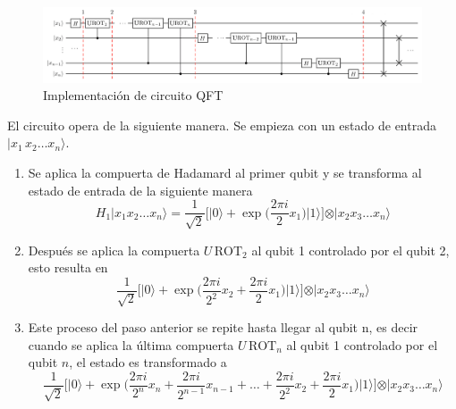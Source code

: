 \documentclass[a4paper]{article}
\begin{document}
\begin{figure}[h]
\begin{center}
\includegraphics[scale=0.29]{./qft_circuit.png} 
\end{center} 
\caption{Implementación de circuito QFT}
\label{fig::QFT_circuit}
\end{figure}
El circuito opera de la siguiente manera. Se empieza con un estado de entrada $\vert x_1\, x_2\hdots x_n\rangle$.
\begin{enumerate}
\item Se aplica la compuerta de Hadamard al primer qubit y se transforma al estado de entrada de la siguiente manera
\begin{equation}
H_1\vert x_1 x_2\hdots x_n\rangle=\frac{1}{\sqrt{2}}\bigg[\vert 0\rangle + \exp{\bigg(\frac{2\pi i }{2} x_1\bigg)}\vert 1\rangle\bigg] \otimes \vert x_2 x_3\hdots x_n\rangle
\end{equation}
\item Después se aplica la compuerta $U\,\text{ROT}_2$ al qubit 1 controlado por el qubit 2, esto resulta en 
\begin{equation}
\frac{1}{\sqrt{2}}\bigg[\vert 0\rangle + \exp{\bigg(\frac{2\pi i }{2^2} x_2+\frac{2\pi i }{2} x_1\bigg)}\vert 1\rangle\bigg] \otimes \vert x_2 x_3\hdots x_n\rangle
\end{equation}
\item Este proceso del paso anterior se repite hasta llegar al qubit n, es decir cuando se aplica la última compuerta $U\,\text{ROT}_n$ al qubit 1 controlado por el qubit $n$, el estado es transformado a
\begin{equation}\label{eq::step3_QFT_circuit}
\frac{1}{\sqrt{2}}\bigg[\vert 0\rangle + \exp{\bigg(\frac{2\pi i }{2^n} x_n+\frac{2\pi i }{2^{n-1}} x_{n-1}+\hdots +\frac{2\pi i }{2^2} x_2+\frac{2\pi i }{2} x_1\bigg)}\vert 1\rangle\bigg] \otimes \vert x_2 x_3\hdots x_n\rangle
\end{equation}


\end{enumerate}
\end{document}
